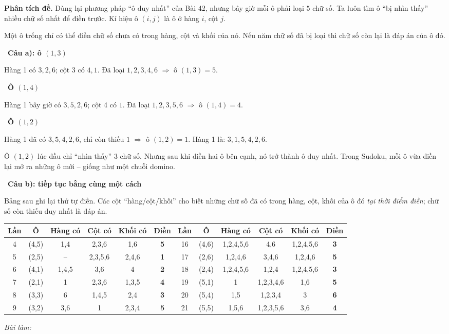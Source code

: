 \documentclass[11pt]{article}
\newif\ifsol \solfalse
\renewcommand{\arraystretch}{1.35}
\newcommand{\StuProb}[2]{\begin{probboxS}{#1}{#2}\StuProbBody\end{probboxS}}
\newcommand{\probsol}[1]{%
  \begin{lrbox}{\solmeasure}\begin{minipage}{\dimexpr\linewidth-24pt\relax}#1\end{minipage}\end{lrbox}%
  \ifsol
    \begin{solbox}#1\end{solbox}%
  \else
    \setlength{\solht}{\dimexpr\ht\solmeasure+\dp\solmeasure+0.85cm\relax}%
    \ifdim\solht<1.35cm\setlength{\solht}{1.35cm}\fi
    \ifdim\solht>\StudentMaxWork\setlength{\solht}{\StudentMaxWork}\fi
    \par\noindent\begin{minipage}{\linewidth}%
    \expandafter\StuProb\StuProbArgs
    \begin{tcolorbox}[colback=white,colframe=Line,boxrule=0.8pt,arc=5pt,
      left=8pt,right=8pt,top=4pt,bottom=4pt,height=\solht]{\footnotesize\color{Slate}\itshape\WorkWord}\end{tcolorbox}%
    \end{minipage}\par\medskip
  \fi}
\newlength{\StudentMaxWork}\setlength{\StudentMaxWork}{4.5cm}
\newcommand{\step}[2]{\par\smallskip\noindent{\bfseries\color{tmBlue!85!black}\StepWord~#1.}\ {\bfseries #2}\par\nopagebreak}
\def\WorkWord{Bài làm:}
\def\StepWord{Bước}
\begin{document}
\probsol{
\textbf{Phân tích đề.} Dùng lại phương pháp ``ô duy nhất'' của Bài 42, nhưng bây giờ mỗi ô phải loại $5$ chữ số. Ta luôn tìm ô
``bị nhìn thấy'' nhiều chữ số nhất để điền trước. Kí hiệu ô $(i, j)$ là ô ở hàng $i$, cột $j$.
\begin{recallbox}Một ô trống chỉ có thể điền chữ số chưa có trong hàng, cột và khối của nó. Nếu năm chữ số đã bị loại thì chữ số còn
lại là đáp án của ô đó.\end{recallbox}
\step{1}{Câu a): ô $(1,3)$}
Hàng 1 có $3, 2, 6$; cột 3 có $4, 1$. Đã loại $1, 2, 3, 4, 6$ $\Rightarrow$ ô $(1,3) = 5$.
\step{2}{Ô $(1,4)$}
Hàng 1 bây giờ có $3, 5, 2, 6$; cột 4 có $1$. Đã loại $1, 2, 3, 5, 6$ $\Rightarrow$ ô $(1,4) = 4$.
\step{3}{Ô $(1,2)$}
Hàng 1 đã có $3, 5, 4, 2, 6$, chỉ còn thiếu $1$ $\Rightarrow$ ô $(1,2) = 1$. Hàng 1 là: $3, 1, 5, 4, 2, 6$.
\begin{tipbox}Ô $(1,2)$ lúc đầu chỉ ``nhìn thấy'' $3$ chữ số. Nhưng sau khi điền hai ô bên cạnh, nó trở thành ô duy nhất. Trong
Sudoku, mỗi ô vừa điền lại mở ra những ô mới -- giống như một chuỗi domino.\end{tipbox}
\step{4}{Câu b): tiếp tục bằng cùng một cách}
Bảng sau ghi lại thứ tự điền. Các cột ``hàng/cột/khối'' cho biết những chữ số đã có trong hàng, cột, khối của ô đó \emph{tại thời
điểm điền}; chữ số còn thiếu duy nhất là đáp án.
\begin{center}\scriptsize
\setlength{\tabcolsep}{3pt}\renewcommand{\arraystretch}{1.12}
\begin{tabular}{|c|c|c|c|c|c||c|c|c|c|c|c|}
\hline
\rowcolor{tmBlue!10} Lần & Ô & Hàng có & Cột có & Khối có & Điền & Lần & Ô & Hàng có & Cột có & Khối có & Điền\\ \hline
4 & (4,5) & 1,4 & 2,3,6 & 1,6 & \textbf{5} & 16 & (4,6) & 1,2,4,5,6 & 4,6 & 1,2,4,5,6 & \textbf{3}\\ \hline
5 & (2,5) & -- & 2,3,5,6 & 2,4,6 & \textbf{1} & 17 & (2,6) & 1,2,4,6 & 3,4,6 & 1,2,4,6 & \textbf{5}\\ \hline
6 & (4,1) & 1,4,5 & 3,6 & 4 & \textbf{2} & 18 & (2,4) & 1,2,4,5,6 & 1,2,4 & 1,2,4,5,6 & \textbf{3}\\ \hline
7 & (2,1) & 1 & 2,3,6 & 1,3,5 & \textbf{4} & 19 & (5,1) & 1 & 1,2,3,4,6 & 1,6 & \textbf{5}\\ \hline
8 & (3,3) & 6 & 1,4,5 & 2,4 & \textbf{3} & 20 & (5,4) & 1,5 & 1,2,3,4 & 3 & \textbf{6}\\ \hline
9 & (3,2) & 3,6 & 1 & 2,3,4 & \textbf{5} & 21 & (5,5) & 1,5,6 & 1,2,3,5,6 & 3,6 & \textbf{4}\\ \hline

\end{tabular}
\end{center}}
\end{document}
